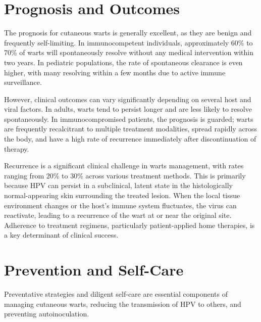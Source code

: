 \section*{Prognosis and Outcomes}
The prognosis for cutaneous warts is generally excellent, as they are benign and frequently self-limiting. In immunocompetent individuals, approximately 60\% to 70\% of warts will spontaneously resolve without any medical intervention within two years. In pediatric populations, the rate of spontaneous clearance is even higher, with many resolving within a few months due to active immune surveillance.

However, clinical outcomes can vary significantly depending on several host and viral factors. In adults, warts tend to persist longer and are less likely to resolve spontaneously. In immunocompromised patients, the prognosis is guarded; warts are frequently recalcitrant to multiple treatment modalities, spread rapidly across the body, and have a high rate of recurrence immediately after discontinuation of therapy.

Recurrence is a significant clinical challenge in warts management, with rates ranging from 20\% to 30\% across various treatment methods. This is primarily because HPV can persist in a subclinical, latent state in the histologically normal-appearing skin surrounding the treated lesion. When the local tissue environment changes or the host's immune system fluctuates, the virus can reactivate, leading to a recurrence of the wart at or near the original site. Adherence to treatment regimens, particularly patient-applied home therapies, is a key determinant of clinical success.

\section*{Prevention and Self-Care}
Preventative strategies and diligent self-care are essential components of managing cutaneous warts, reducing the transmission of HPV to others, and preventing autoinoculation.


